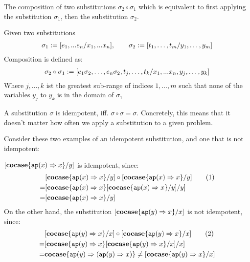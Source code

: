 \documentclass[twoside,12pt,a4paper]{article}
\begin{document}
The composition of two substitutions $\sigma_2 \circ \sigma_1$ which is equivalent to first applying the substitution $\sigma_1$, then the substitution $\sigma_2$.

\begin{definition}
    Given two substitutions
    \begin{align*}
        \sigma_1 := [e_1,...e_n/x_1,...x_n],\qquad \sigma_2 := [t_1,\dots,t_m/y_1,\dots,y_m]
    \end{align*}
    Composition is defined as:
    \begin{align*}
        \sigma_2\circ\sigma_1 := [e_1\sigma_2,\dots,e_n\sigma_2,t_j,\dots,t_k/x_1,...x_n,y_j,\dots,y_k]
    \end{align*}
    Where $j, \dots, k$ ist the greatest sub-range of indices $1,\dots,m$ such that none of the variables $y_j$ to $y_k$ is in the domain of $\sigma_1$ 
\end{definition}

\begin{definition}[Idempotency]
    A substitution $\sigma$ is idempotent, iff. $\sigma \circ \sigma = \sigma$.
    Concretely, this means that it doesn't matter how often we apply a substitution to a given problem.
\end{definition}

Consider these two examples of an idempotent substitution, and one that is not idempotent:
\begin{example}
    $[\textbf{cocase}\{\texttt{ap}(x)\Rightarrow x\} / y]$ is idempotent, since:
    \begin{align*}
        &[\textbf{cocase}\{\texttt{ap}(x)\Rightarrow x\} / y] \circ [\textbf{cocase}\{\texttt{ap}(x)\Rightarrow x\} / y] \tag{1}\\
        =& [\textbf{cocase}\{\texttt{ap}(x)\Rightarrow x\}[\textbf{cocase}\{\texttt{ap}(x)\Rightarrow x\} / y] / y] \\
        =& [\textbf{cocase}\{\texttt{ap}(x)\Rightarrow x\} / y] 
    \end{align*}
On the other hand, the substitution $[\textbf{cocase}\{\texttt{ap}(y)\Rightarrow x\} / x]$ is not idempotent, since:
\begin{align*}
    &[\textbf{cocase}\{\texttt{ap}(y)\Rightarrow x\} / x] \circ [\textbf{cocase}\{\texttt{ap}(y)\Rightarrow x\} / x]\tag{2}\\ 
    =& [\textbf{cocase}\{\texttt{ap}(y)\Rightarrow x\}[\textbf{cocase}\{\texttt{ap}(y)\Rightarrow x\} / x] / x] \\
    =& \textbf{cocase}\{\texttt{ap}(y)\Rightarrow (\texttt{ap}(y)\Rightarrow x) \} \neq [\textbf{cocase}\{\texttt{ap}(y)\Rightarrow x\} / x]
\end{align*}

\end{example}
\end{document}
